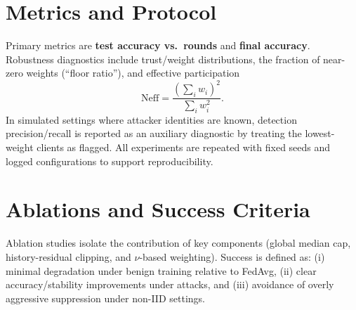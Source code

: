 \section{Metrics and Protocol}

Primary metrics are \textbf{test accuracy vs.\ rounds} and \textbf{final accuracy}. Robustness diagnostics include trust/weight distributions, the fraction of near-zero weights (``floor ratio''), and effective participation
\[
\mathrm{Neff} = \frac{(\sum_i w_i)^2}{\sum_i w_i^2}.
\]
In simulated settings where attacker identities are known, detection precision/recall is reported as an auxiliary diagnostic by treating the lowest-weight clients as flagged. All experiments are repeated with fixed seeds and logged configurations to support reproducibility.

\section{Ablations and Success Criteria}

Ablation studies isolate the contribution of key components (global median cap, history-residual clipping, and $\nu$-based weighting). Success is defined as: (i) minimal degradation under benign training relative to FedAvg, (ii) clear accuracy/stability improvements under attacks, and (iii) avoidance of overly aggressive suppression under non-IID settings.
